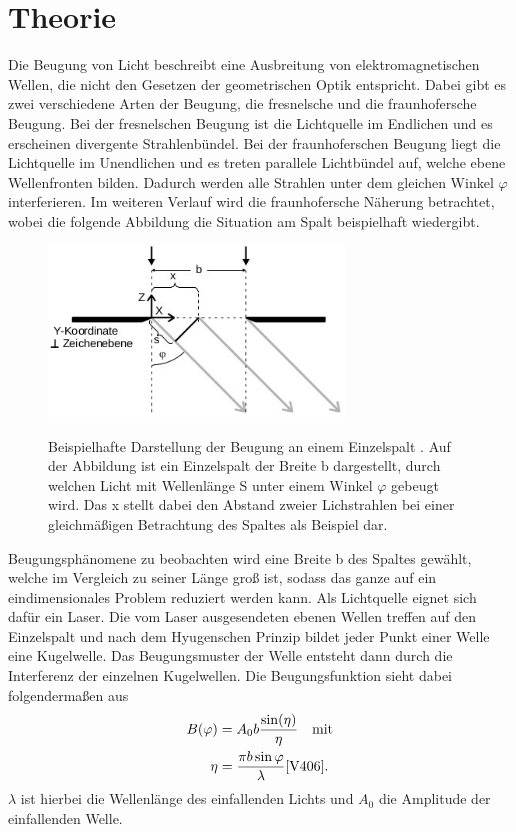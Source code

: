 \section{Theorie}
Die Beugung von Licht beschreibt eine Ausbreitung von elektromagnetischen Wellen,
die nicht den Gesetzen der geometrischen Optik entspricht. Dabei gibt es zwei verschiedene
Arten der Beugung, die fresnelsche und die fraunhofersche Beugung. Bei der fresnelschen
Beugung ist die Lichtquelle im Endlichen und es erscheinen divergente Strahlenbündel.
Bei der fraunhoferschen Beugung  liegt die Lichtquelle im Unendlichen und es treten
parallele Lichtbündel auf, welche ebene Wellenfronten bilden. Dadurch werden alle
Strahlen unter dem gleichen Winkel $\varphi$ interferieren. Im weiteren Verlauf  wird
die fraunhofersche Näherung betrachtet, wobei die folgende Abbildung die Situation am Spalt 
beispielhaft wiedergibt.
\begin{figure}[H]
    \centering
    \includegraphics[width=0.7\textwidth]{images/spalt.jpg}
    \label{fig:1}
    \caption{Beispielhafte Darstellung der Beugung an einem Einzelspalt \cite{V406}.
    Auf der Abbildung ist ein Einzelspalt der Breite b dargestellt, durch welchen 
    Licht mit Wellenlänge S unter einem Winkel $\varphi$ gebeugt wird. Das x stellt dabei
    den Abstand zweier Lichstrahlen bei einer gleichmäßigen Betrachtung des Spaltes als Beispiel dar.
    }
\end{figure}
\justifying Beugungsphänomene zu beobachten wird eine  Breite b des Spaltes gewählt, welche  im Vergleich zu
seiner Länge groß ist, sodass das ganze auf ein eindimensionales Problem reduziert werden kann.
Als Lichtquelle eignet sich dafür ein Laser. Die vom Laser ausgesendeten ebenen Wellen
treffen auf den Einzelspalt und nach dem Hyugenschen Prinzip bildet jeder Punkt einer Welle
eine Kugelwelle. Das Beugungsmuster der Welle entsteht dann durch die Interferenz der einzelnen
Kugelwellen. Die Beugungsfunktion sieht dabei folgendermaßen aus
\begin{align}
    B(\varphi) &= A_0 b \frac{\sin (\eta)}{\eta}  \label{eq:1} \quad \text{mit}\\
    \eta &= \frac{\pi b \sin \varphi}{\lambda} \label{eq:2} \text{\cite{V406}} .
\end{align}
$\lambda$ ist hierbei die Wellenlänge des einfallenden Lichts und $A_0$ die Amplitude
der einfallenden Welle.

